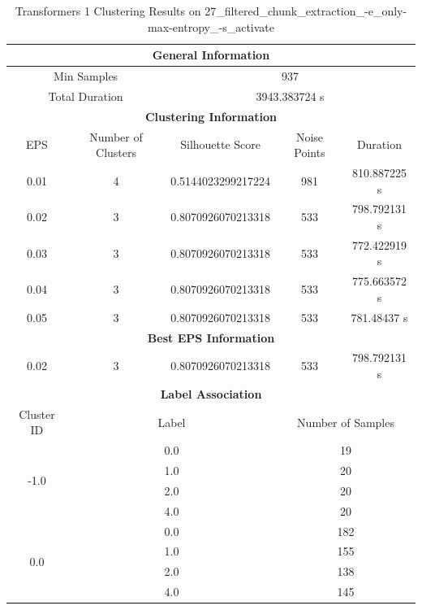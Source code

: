 \begin{longtable}{|c|c|c|c|c|}
\caption{Transformers 1 Clustering Results on 27\_filtered\_chunk\_extraction\_-e\_only-max-entropy\_-s\_activate} \label{tab:27_filtered_chunk_extraction_-e_only-max-entropy_-s_activate_transformers_1_clustering_results}\\
\hline
\multicolumn{5}{|c|}{\textbf{General Information}} \\
\hline
\multicolumn{2}{|c|}{Min Samples} & \multicolumn{3}{c|}{937} \\
\multicolumn{2}{|c|}{Total Duration} & \multicolumn{3}{c|}{3943.383724 s} \\
\hline
\multicolumn{5}{|c|}{\textbf{Clustering Information}} \\
\hline
EPS & Number of Clusters & Silhouette Score & Noise Points & Duration \\
0.01 & 4 & 0.5144023299217224 & 981 & 810.887225 s\\
0.02 & 3 & 0.8070926070213318 & 533 & 798.792131 s\\
0.03 & 3 & 0.8070926070213318 & 533 & 772.422919 s\\
0.04 & 3 & 0.8070926070213318 & 533 & 775.663572 s\\
0.05 & 3 & 0.8070926070213318 & 533 & 781.48437 s\\
\hline
\multicolumn{5}{|c|}{\textbf{Best EPS Information}} \\
\hline
0.02 & 3 & 0.8070926070213318 & 533 & 798.792131 s\\
\hline
\multicolumn{5}{|c|}{\textbf{Label Association}} \\
\hline
Cluster ID & \multicolumn{2}{c|}{Label} & \multicolumn{2}{c|}{Number of Samples} \\
\hline
\multirow{4}{*}{-1.0} & \multicolumn{2}{c|}{0.0} & \multicolumn{2}{c|}{19} \\
& \multicolumn{2}{c|}{1.0} & \multicolumn{2}{c|}{20} \\
& \multicolumn{2}{c|}{2.0} & \multicolumn{2}{c|}{20} \\
& \multicolumn{2}{c|}{4.0} & \multicolumn{2}{c|}{20} \\
\hline
\multirow{4}{*}{0.0} & \multicolumn{2}{c|}{0.0} & \multicolumn{2}{c|}{182} \\
& \multicolumn{2}{c|}{1.0} & \multicolumn{2}{c|}{155} \\
& \multicolumn{2}{c|}{2.0} & \multicolumn{2}{c|}{138} \\
& \multicolumn{2}{c|}{4.0} & \multicolumn{2}{c|}{145} \\

\end{longtable}
